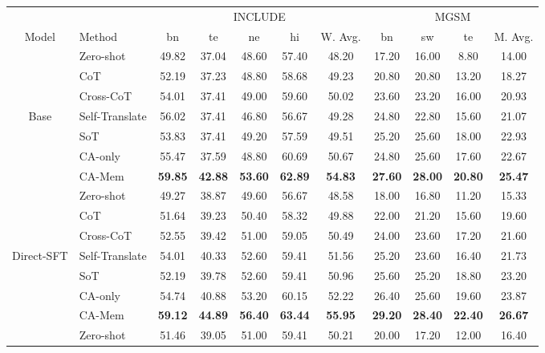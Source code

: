 \documentclass[11pt]{article}
\begin{document}
\begin{table}[t]
\centering
\scriptsize
\setlength{\tabcolsep}{1.5pt}
\renewcommand{\arraystretch}{0.90}
\begin{tabular*}{\textwidth}{@{\extracolsep{\fill}} c l c c c c c c c c c}
\hline
& & \multicolumn{5}{c}{INCLUDE} & \multicolumn{4}{c}{MGSM} \\
\cline{3-7}\cline{8-11}
Model & Method & bn & te & ne & hi & W. Avg. & bn & sw & te & M. Avg. \\
\hline
 & Zero-shot & 49.82 & 37.04 & 48.60 & 57.40 & 48.20 & 17.20 & 16.00 & 8.80 & 14.00 \\
 & CoT & 52.19 & 37.23 & 48.80 & 58.68 & 49.23 & 20.80 & 20.80 & 13.20 & 18.27 \\
 & Cross-CoT & 54.01 & 37.41 & 49.00 & 59.60 & 50.02 & 23.60 & 23.20 & 16.00 & 20.93 \\
Base & Self-Translate & 56.02 & 37.41 & 46.80 & 56.67 & 49.28 & 24.80 & 22.80 & 15.60 & 21.07 \\
 & SoT & 53.83 & 37.41 & 49.20 & 57.59 & 49.51 & 25.20 & 25.60 & 18.00 & 22.93 \\
 & CA-only & 55.47 & 37.59 & 48.80 & 60.69 & 50.67 & 24.80 & 25.60 & 17.60 & 22.67 \\
 & CA-Mem & \textbf{59.85} & \textbf{42.88} & \textbf{53.60} & \textbf{62.89} & \textbf{54.83} & \textbf{27.60} & \textbf{28.00} & \textbf{20.80} & \textbf{25.47} \\
\cline{1-11}
 & Zero-shot & 49.27 & 38.87 & 49.60 & 56.67 & 48.58 & 18.00 & 16.80 & 11.20 & 15.33 \\
 & CoT & 51.64 & 39.23 & 50.40 & 58.32 & 49.88 & 22.00 & 21.20 & 15.60 & 19.60 \\
 & Cross-CoT & 52.55 & 39.42 & 51.00 & 59.05 & 50.49 & 24.00 & 23.60 & 17.20 & 21.60 \\
Direct-SFT & Self-Translate & 54.01 & 40.33 & 52.60 & 59.41 & 51.56 & 25.20 & 23.60 & 16.40 & 21.73 \\
 & SoT & 52.19 & 39.78 & 52.60 & 59.41 & 50.96 & 25.60 & 25.20 & 18.80 & 23.20 \\
 & CA-only & 54.74 & 40.88 & 53.20 & 60.15 & 52.22 & 26.40 & 25.60 & 19.60 & 23.87 \\
 & CA-Mem & \textbf{59.12} & \textbf{44.89} & \textbf{56.40} & \textbf{63.44} & \textbf{55.95} & \textbf{29.20} & \textbf{28.40} & \textbf{22.40} & \textbf{26.67} \\
\cline{1-11}
 & Zero-shot & 51.46 & 39.05 & 51.00 & 59.41 & 50.21 & 20.00 & 17.20 & 12.00 & 16.40 \\

\end{tabular*}
\end{table}
\end{document}
